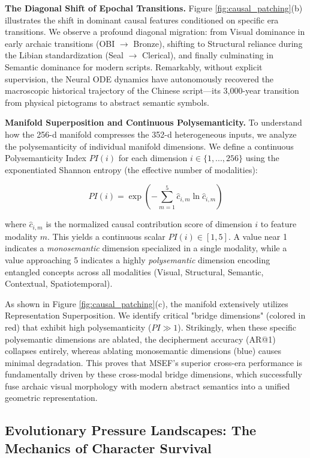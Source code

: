 \documentclass{article}
\begin{document}
\textbf{The Diagonal Shift of Epochal Transitions.} 
Figure \ref{fig:causal_patching}(b) illustrates the shift in dominant causal features conditioned on specific era transitions. We observe a profound diagonal migration: from Visual dominance in early archaic transitions (OBI $\rightarrow$ Bronze), shifting to Structural reliance during the Libian standardization (Seal $\rightarrow$ Clerical), and finally culminating in Semantic dominance for modern scripts. Remarkably, without explicit supervision, the Neural ODE dynamics have autonomously recovered the macroscopic historical trajectory of the Chinese script—its 3,000-year transition from physical pictograms to abstract semantic symbols.

\textbf{Manifold Superposition and Continuous Polysemanticity.} 
To understand how the 256-d manifold compresses the 352-d heterogeneous inputs, we analyze the polysemanticity of individual manifold dimensions. We define a continuous Polysemanticity Index $PI(i)$ for each dimension $i \in \{1, ..., 256\}$ using the exponentiated Shannon entropy (the effective number of modalities):

\begin{equation}
PI(i) = \exp \left( - \sum_{m=1}^{5} \hat{c}_{i,m} \ln \hat{c}_{i,m} \right)
\end{equation}

where $\hat{c}_{i,m}$ is the normalized causal contribution score of dimension $i$ to feature modality $m$. This yields a continuous scalar $PI(i) \in [1, 5]$. A value near 1 indicates a \textit{monosemantic} dimension specialized in a single modality, while a value approaching 5 indicates a highly \textit{polysemantic} dimension encoding entangled concepts across all modalities (Visual, Structural, Semantic, Contextual, Spatiotemporal).

As shown in Figure \ref{fig:causal_patching}(c), the manifold extensively utilizes Representation Superposition. We identify critical "bridge dimensions" (colored in red) that exhibit high polysemanticity ($PI \gg 1$). Strikingly, when these specific polysemantic dimensions are ablated, the decipherment accuracy (AR@1) collapses entirely, whereas ablating monosemantic dimensions (blue) causes minimal degradation. This proves that MSEF's superior cross-era performance is fundamentally driven by these cross-modal bridge dimensions, which successfully fuse archaic visual morphology with modern abstract semantics into a unified geometric representation.


\subsection{Evolutionary Pressure Landscapes: The Mechanics of Character Survival}
\label{sec:extinction_landscape}
\end{document}
